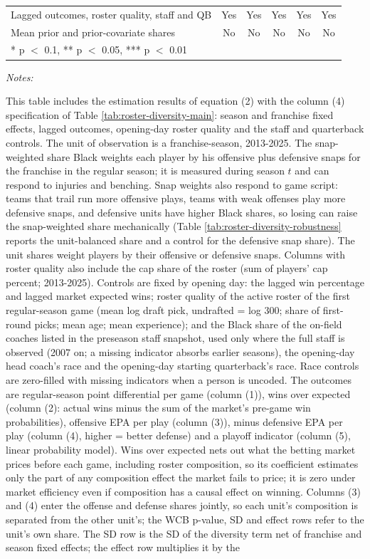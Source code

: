 \begin{table}[!h]
{\begin{threeparttable}
\begin{tabular}[t]{lccccc}
Lagged outcomes, roster quality, staff and QB & Yes & Yes & Yes & Yes & Yes\\
Mean prior and prior-covariate shares & No & No & No & No & No\\
\bottomrule
\multicolumn{6}{l}{\rule{0pt}{1em}* p $<$ 0.1, ** p $<$ 0.05, *** p $<$ 0.01}\\
\end{tabular}
\begin{tablenotes}[para]
\item \textit{Notes:} 
\item This table includes the estimation results of equation (2) with the column (4) specification of Table \ref{tab:roster-diversity-main}: season and franchise fixed effects, lagged outcomes, opening-day roster quality and the staff and quarterback controls. The unit of observation is a franchise-season, 2013-2025. The snap-weighted share Black weights each player by his offensive plus defensive snaps for the franchise in the regular season; it is measured during season $t$ and can respond to injuries and benching. Snap weights also respond to game script: teams that trail run more offensive plays, teams with weak offenses play more defensive snaps, and defensive units have higher Black shares, so losing can raise the snap-weighted share mechanically (Table \ref{tab:roster-diversity-robustness} reports the unit-balanced share and a control for the defensive snap share). The unit shares weight players by their offensive or defensive snaps. Columns with roster quality also include the cap share of the roster (sum of players' cap percent; 2013-2025). Controls are fixed by opening day: the lagged win percentage and lagged market expected wins; roster quality of the active roster of the first regular-season game (mean log draft pick, undrafted = log 300; share of first-round picks; mean age; mean experience); and the Black share of the on-field coaches listed in the preseason staff snapshot, used only where the full staff is observed (2007 on; a missing indicator absorbs earlier seasons), the opening-day head coach's race and the opening-day starting quarterback's race. Race controls are zero-filled with missing indicators when a person is uncoded. The outcomes are regular-season point differential per game (column (1)), wins over expected (column (2): actual wins minus the sum of the market's pre-game win probabilities), offensive EPA per play (column (3)), minus defensive EPA per play (column (4), higher = better defense) and a playoff indicator (column (5), linear probability model). Wins over expected nets out what the betting market prices before each game, including roster composition, so its coefficient estimates only the part of any composition effect the market fails to price; it is zero under market efficiency even if composition has a causal effect on winning. Columns (3) and (4) enter the offense and defense shares jointly, so each unit's composition is separated from the other unit's; the WCB p-value, SD and effect rows refer to the unit's own share. The SD row is the SD of the diversity term net of franchise and season fixed effects; the effect row multiplies it by the 
\end{tablenotes}
\end{threeparttable}}
\end{table}
